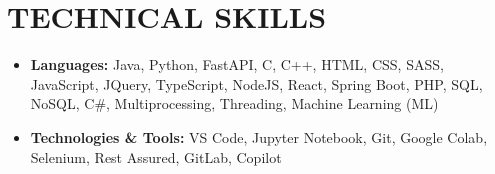\section{TECHNICAL SKILLS} {
    \begin{itemize}[leftmargin=0.15in, label={}]
        \item{\textbf{\normalsize{Languages:}}{ \normalsize{Java, Python, FastAPI, C, C++, HTML, CSS, SASS, JavaScript, JQuery, TypeScript, NodeJS, React, Spring Boot, PHP, SQL, NoSQL, C\#, Multiprocessing, Threading, Machine Learning (ML)}}}
        \vspace{-0.3cm}
        \item{\textbf{\normalsize{Technologies \& Tools:}}{ \normalsize{VS Code, Jupyter Notebook, Git, Google Colab, Selenium, Rest Assured, GitLab, Copilot}}}
    \end{itemize}
}